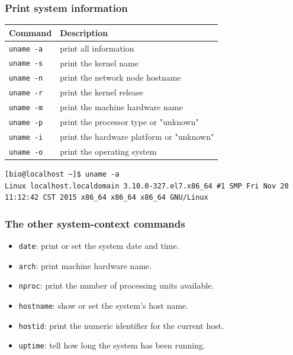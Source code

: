 \documentclass[red]{beamer}
\begin{document}
\begin{CJK*}{UTF8}{gbsn}
\begin{frame}
\frametitle{Print system information}
\begin{table}[ht]
\scriptsize
\renewcommand\arraystretch{1.6}
\begin{tabular}{ll}
\hline
\textbf{Command} & \textbf{Description}\\
\hline
\texttt{uname -a} & print all information\\
\texttt{uname -s} & print the kernel name\\
\texttt{uname -n} & print the network node hostname\\
\texttt{uname -r} & print the kernel release\\
\texttt{uname -m} & print the machine hardware name\\
\texttt{uname -p} & print the processor type or "unknown"\\
\texttt{uname -i} & print the hardware platform or "unknown"\\
\texttt{uname -o} & print the operating system\\
\hline
\end{tabular}
\end{table}
\begin{lstlisting}[basicstyle=\tiny]
[bio@localhost ~]$ uname -a
Linux localhost.localdomain 3.10.0-327.el7.x86_64 #1 SMP Fri Nov 20 11:12:42 CST 2015 x86_64 x86_64 x86_64 GNU/Linux
\end{lstlisting}
\end{frame}


\begin{frame}[containsverbatim]
\frametitle{The other system-context commands}
\begin{itemize}
	\item \lstinline{date}: print or set the system date and time.
	\item \lstinline{arch}: print machine hardware name.
	\item \lstinline{nproc}: print the number of processing units available.
	\item \lstinline{hostname}: show or set the system's host name.
	\item \lstinline{hostid}: print the numeric identifier for the current host.
	\item \lstinline{uptime}: tell how long the system has been running.
\end{itemize}
\end{frame}



\end{CJK*}
\end{document}

